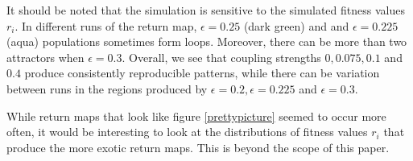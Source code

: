 \documentclass[conference]{IEEEtran}
\begin{document}
\noindent It should be noted that the simulation is sensitive to the simulated fitness values $r_i$.  In different runs of the return map, $\epsilon = 0.25$ (dark green) and and $\epsilon = 0.225$ (aqua) populations sometimes form loops. Moreover, there can be more than two attractors when $\epsilon = 0.3$.  Overall, we see that coupling strengths $0, 0.075, 0.1$ and $0.4$ produce consistently reproducible patterns, while there can be variation between runs in the regions produced by $\epsilon = 0.2,  \epsilon = 0.225$ and $\epsilon = 0.3$. 


    

\noindent While return maps that look like figure \ref{prettypicture} seemed to occur more often, it would be interesting to look at the distributions of fitness values $r_i$ that produce the more exotic return maps. This is beyond the scope of this paper.
\end{document}
